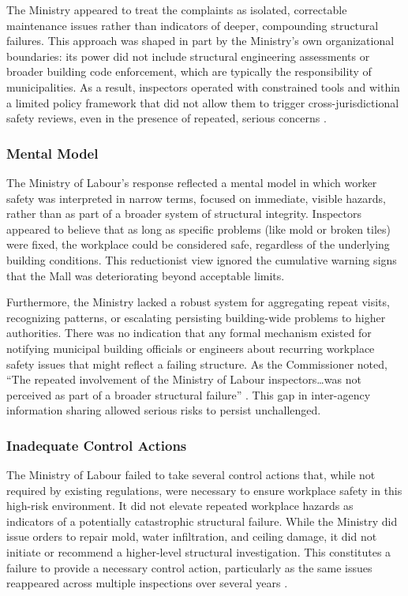 \documentclass[12pt]{article}
\begin{document}
The Ministry appeared to treat the complaints as isolated, correctable maintenance issues rather than indicators of deeper, compounding structural failures. This approach was shaped in part by the Ministry's own organizational boundaries: its power did not include structural engineering assessments or broader building code enforcement, which are typically the responsibility of municipalities. As a result, inspectors operated with constrained tools and within a limited policy framework that did not allow them to trigger cross-jurisdictional safety reviews, even in the presence of repeated, serious concerns \cite[p148-149]{AlgoLakeReport1}.

\subsubsection*{Mental Model}

The Ministry of Labour's response reflected a mental model in which worker safety was interpreted in narrow terms, focused on immediate, visible hazards, rather than as part of a broader system of structural integrity. Inspectors appeared to believe that as long as specific problems (like mold or broken tiles) were fixed, the workplace could be considered safe, regardless of the underlying building conditions. This reductionist view ignored the cumulative warning signs that the Mall was deteriorating beyond acceptable limits.

Furthermore, the Ministry lacked a robust system for aggregating repeat visits, recognizing patterns, or escalating persisting building-wide problems to higher authorities. There was no indication that any formal mechanism existed for notifying municipal building officials or engineers about recurring workplace safety issues that might reflect a failing structure. As the Commissioner noted, ``The repeated involvement of the Ministry of Labour inspectors…was not perceived as part of a broader structural failure'' \cite[p148]{AlgoLakeReport1}. This gap in inter-agency information sharing allowed serious risks to persist unchallenged.

\subsubsection*{Inadequate Control Actions}

The Ministry of Labour failed to take several control actions that, while not required by existing regulations, were necessary to ensure workplace safety in this high-risk environment. It did not elevate repeated workplace hazards as indicators of a potentially catastrophic structural failure. While the Ministry did issue orders to repair mold, water infiltration, and ceiling damage, it did not initiate or recommend a higher-level structural investigation. This constitutes a failure to provide a necessary control action, particularly as the same issues reappeared across multiple inspections over several years \cite[p145-149]{AlgoLakeReport1}.
\end{document}
